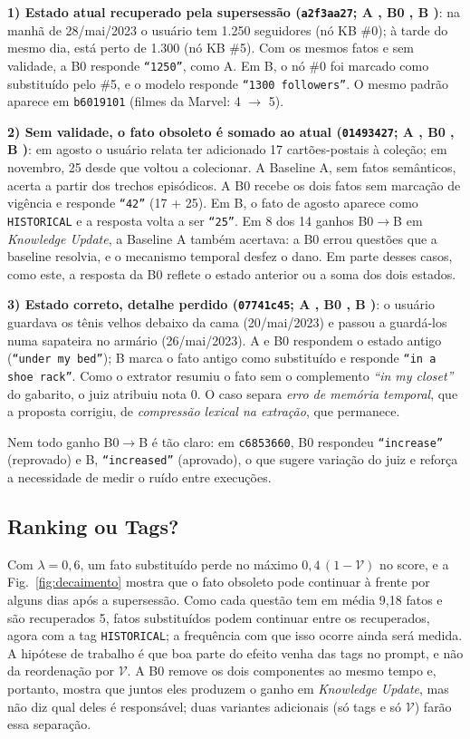 \documentclass[10pt,conference,twocolumn]{IEEEtran}
\begin{document}
\textbf{1) Estado atual recuperado pela supersessão (\texttt{a2f3aa27}; A , B0 , B )}: na manhã de 28/mai/2023 o usuário tem 1.250 seguidores (nó KB \#0); à tarde do mesmo dia, está perto de 1.300 (nó KB \#5). Com os mesmos fatos e sem validade, a B0 responde \texttt{``1250''}, como A. Em B, o nó \#0 foi marcado como substituído pelo \#5, e o modelo responde \texttt{``1300 followers''}. O mesmo padrão aparece em \texttt{b6019101} (filmes da Marvel: 4 $\rightarrow$ 5).

\textbf{2) Sem validade, o fato obsoleto é somado ao atual (\texttt{01493427}; A , B0 , B )}: em agosto o usuário relata ter adicionado 17 cartões-postais à coleção; em novembro, 25 desde que voltou a colecionar. A Baseline A, sem fatos semânticos, acerta a partir dos trechos episódicos. A B0 recebe os dois fatos sem marcação de vigência e responde \texttt{``42''} (17 + 25). Em B, o fato de agosto aparece como \texttt{HISTORICAL} e a resposta volta a ser \texttt{``25''}. Em 8 dos 14 ganhos B0$\rightarrow$B em \textit{Knowledge Update}, a Baseline A também acertava: a B0 errou questões que a baseline resolvia, e o mecanismo temporal desfez o dano. Em parte desses casos, como este, a resposta da B0 reflete o estado anterior ou a soma dos dois estados.

\textbf{3) Estado correto, detalhe perdido (\texttt{07741c45}; A , B0 , B )}: o usuário guardava os tênis velhos debaixo da cama (20/mai/2023) e passou a guardá-los numa sapateira no armário (26/mai/2023). A e B0 respondem o estado antigo (\texttt{``under my bed''}); B marca o fato antigo como substituído e responde \texttt{``in a shoe rack''}. Como o extrator resumiu o fato sem o complemento \textit{``in my closet''} do gabarito, o juiz atribuiu nota 0. O caso separa \textit{erro de memória temporal}, que a proposta corrigiu, de \textit{compressão lexical na extração}, que permanece.

Nem todo ganho B0$\rightarrow$B é tão claro: em \texttt{c6853660}, B0 respondeu \texttt{``increase''} (reprovado) e B, \texttt{``increased''} (aprovado), o que sugere variação do juiz e reforça a necessidade de medir o ruído entre execuções.

\subsection{Ranking ou Tags?}
Com $\lambda = 0{,}6$, um fato substituído perde no máximo $0{,}4\,(1-\mathcal{V})$ no score, e a Fig.~\ref{fig:decaimento} mostra que o fato obsoleto pode continuar à frente por alguns dias após a supersessão. Como cada questão tem em média 9,18 fatos e são recuperados 5, fatos substituídos podem continuar entre os recuperados, agora com a tag \texttt{HISTORICAL}; a frequência com que isso ocorre ainda será medida. A hipótese de trabalho é que boa parte do efeito venha das tags no prompt, e não da reordenação por $\mathcal{V}$. A B0 remove os dois componentes ao mesmo tempo e, portanto, mostra que juntos eles produzem o ganho em \textit{Knowledge Update}, mas não diz qual deles é responsável; duas variantes adicionais (só tags e só $\mathcal{V}$) farão essa separação.
\end{document}
